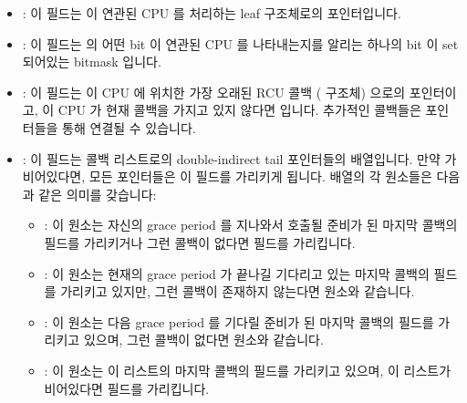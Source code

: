 \begin{itemize}
\item	{}:
	이 필드는 이 연관된 CPU 를 처리하는 leaf  구조체로의
	포인터입니다.
\item	{}:
	이 필드는  의 어떤 bit 이 연관된 CPU 를 나타내는지를
	알리는 하나의 bit 이 set 되어있는 bitmask 입니다.
\item	{}:
	이 필드는 이 CPU 에 위치한 가장 오래된 RCU 콜백 ( 구조체)
	으로의 포인터이고, 이 CPU 가 현재 콜백을 가지고 있지 않다면 
	입니다.
	추가적인 콜백들은  포인터들을 통해 연결될 수 있습니다.
\item	{}:
	이 필드는  콜백 리스트로의 double-indirect tail 포인터들의
	배열입니다.
	만약  가 비어있다면, 모든  포인터들은 이
	 필드를 가리키게 됩니다.
	 배열의 각 원소들은 다음과 같은 의미를 갖습니다:
	\iffalse

\item	\co{mynode}:
	This field is a pointer to the leaf \co{rcu_node} structure that
	handles the corresponding CPU.
\item	\co{grpmask}:
	This field is a bitmask that has the single bit set that indicates
	which bit in \co{mynode->qsmask} signifies the corresponding CPU.
\item	\co{nxtlist}:
	This field is a pointer to the oldest RCU callback (\co{rcu_head}
	structure) residing on this CPU, or \co{NULL} if this CPU currently
	has no such callbacks.
	Additional callbacks may be chained via their \co{next} pointers.
\item	\co{nxttail}:
	This field is an array of double-indirect tail pointers
	into the \co{nxtlist} callback list.
	If \co{nxtlist} is empty, then all of the \co{nxttail} pointers
	directly reference the \co{nxtlist} field.
	Each element of the \co{nxttail} array has meaning as follows:
	\fi
	\begin{itemize}
	\item	{}:
		이 원소는 자신의 grace period 를 지나와서 호출될 준비가 된
		마지막 콜백의  필드를 가리키거나 그런 콜백이
		없다면  필드를 가리킵니다.
	\item	{}:
		이 원소는 현재의 grace period 가 끝나길 기다리고 있는 마지막
		콜백의  필드를 가리키고 있지만, 그런 콜백이 존재하지
		않는다면  원소와 같습니다.
	\item	{}:
		이 원소는 다음 grace period 를 기다릴 준비가 된 마지막 콜백의
		 필드를 가리키고 있으며, 그런 콜백이 없다면
		 원소와 같습니다.
	\item	{}:
		이 원소는 이 리스트의 마지막 콜백의  필드를 가리키고
		있으며, 이 리스트가 비어있다면  필드를 가리킵니다.
	\iffalse


\end{itemize}
\end{itemize}
